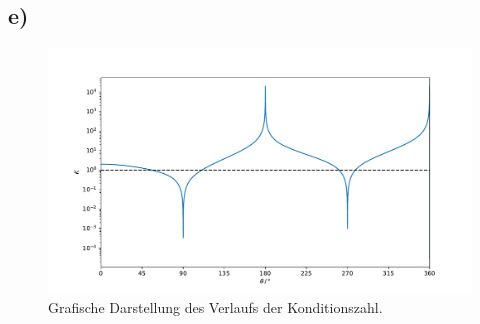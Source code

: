 \documentclass[a4paper, 11pt]{article}
\begin{document}
\subsection*{e)}
\begin{figure}
    \centering
    \includegraphics[width=\textwidth]{../A04/A4_kond.pdf}
    \caption{Grafische Darstellung des Verlaufs der Konditionszahl.}
    \label{fig:K}
\end{figure}
\end{document}
